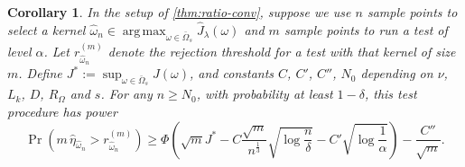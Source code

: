 \documentclass{article}
\newtheorem{corollary}[theorem]{Corollary} \crefname{corollary}{Corollary}{Corollaries}
\DeclareMathOperator*{\argmax}{arg\,max}
\begin{document}
\begin{corollary} \label{thm:opt-power}
    In the setup of \cref{thm:ratio-conv},
    suppose we use $n$ sample points to select a kernel $\hat\omega_n \in \argmax_{\omega \in \bar\Omega_s} \hat J_\lambda(\omega)$
    and $m$ sample points to run a test of level $\alpha$.
    Let $r_{\hat\omega_n}^{(m)}$ denote the rejection threshold for a test with that kernel of size $m$.
Define
    $J^* := \sup_{\omega \in \bar\Omega_s} J(\omega)$,
    and constants $C$, $C'$, $C''$, $N_0$ depending on $\nu$, $L_k$, $D$, $R_\Omega$ and $s$.
    For any $n \ge N_0$,
    with probability at least $1 - \delta$,
    this test procedure has power
    \[
           \Pr\left( m \, \hat\eta_{\hat\omega_n} > r^{(m)}_{\hat\omega_n} \right)
       \ge \Phi\left(
             \sqrt{m} J^*
           - C \frac{\sqrt m}{n^{\frac13}} \sqrt{\log\frac{n}{\delta}}
           - C' \sqrt{\log\frac1\alpha}
           \right)
         - \frac{C''}{\sqrt m}
    .\]
\end{corollary}
\end{document}
